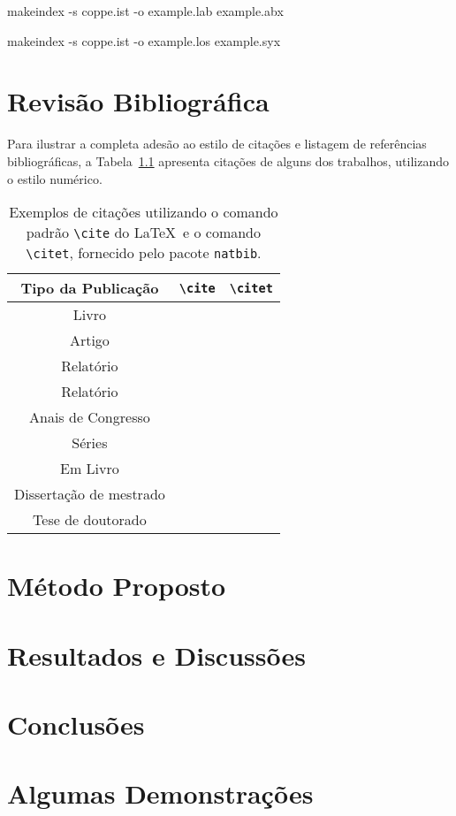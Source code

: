 \documentclass[msc,numbers]{ufamppgee}
\begin{document}
  makeindex -s coppe.ist -o example.lab example.abx
  
  makeindex -s coppe.ist -o example.los example.syx

  \chapter{Revisão Bibliográfica}

  Para ilustrar a completa adesão ao estilo de citações e listagem de
  referências bibliográficas, a Tabela~\ref{tab:citation} apresenta citações de alguns dos trabalhos, utilizando o estilo numérico.

  \begin{table}[h]
  \caption{Exemplos de citações utilizando o comando padrão
    \texttt{\textbackslash cite} do \LaTeX\ e
    o comando \texttt{\textbackslash citet},
    fornecido pelo pacote \texttt{natbib}.}
  \label{tab:citation}
  \centering
  {\footnotesize
  \begin{tabular}{|c|c|c|}
    \hline
    Tipo da Publicação & \verb|\cite| & \verb|\citet|\\
    \hline
    Livro & \cite{book-example} & \citet{book-example}\\
    Artigo & \cite{article-example} & \citet{article-example}\\
    Relat\'orio & \cite{techreport-example} & \citet{techreport-example}\\
    Relat\'orio & \cite{techreport-exampleIn} & \citet{techreport-exampleIn}\\
    Anais de Congresso & \cite{inproceedings-example} &
      \citet{inproceedings-example}\\
    S\'eries & \cite{incollection-example} & \citet{incollection-example}\\
    Em Livro & \cite{inbook-example} & \citet{inbook-example}\\
    Disserta{\c c}\~ao de mestrado & \cite{mastersthesis-example} &
      \citet{mastersthesis-example}\\
    Tese de doutorado & \cite{phdthesis-example} & \citet{phdthesis-example}\\
    \hline
  \end{tabular}}
  \end{table}

  \chapter{Método Proposto}
  \chapter{Resultados e Discussões}
  \chapter{Conclusões}

  \backmatter
  
  

  \appendix
  \chapter{Algumas Demonstrações}
\end{document}
